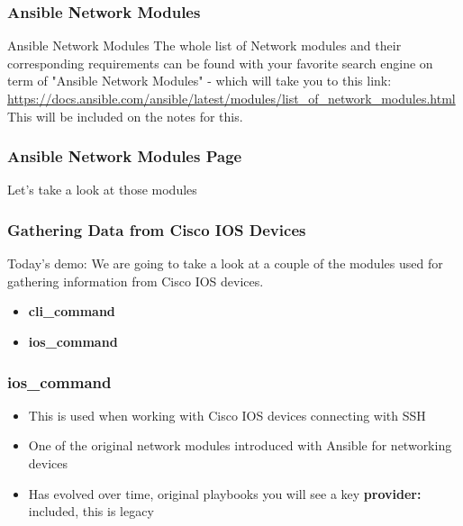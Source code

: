 \documentclass{beamer}
\begin{document}
\begin{frame}
  \frametitle{Ansible Network Modules}
  \begin{block}{Ansible Network Modules}
    The whole list of Network modules and their corresponding requirements
    can be found with your favorite search engine on term of "Ansible Network Modules" 
    - which will take you to this link: \url{https://docs.ansible.com/ansible/latest/modules/list_of_network_modules.html}
    This will be included on the notes for this.
    \end{block}
\end{frame}

\begin{frame}
  \frametitle{Ansible Network Modules Page}
    Let's take a look at those modules
\end{frame}




\begin{frame}
    \frametitle{Gathering Data from Cisco IOS Devices}
    Today's demo: We are going to take a look at a couple of the modules used
    for gathering information from Cisco IOS devices. 
    \begin{itemize}
        \item<2-> \textbf{cli\_command}
        \item<3-> \textbf{ios\_command}
    \end{itemize}
\end{frame}

\begin{frame}
    \frametitle{ios\_command}
    \begin{itemize}
      \item <1-> This is used when working with Cisco IOS devices connecting with SSH
      \item <2-> One of the original network modules introduced with Ansible for networking devices
      \item <3-> Has evolved over time, original playbooks you will see a key \textbf{provider:} included, this is legacy
    \end{itemize}
\end{frame}
\end{document}
